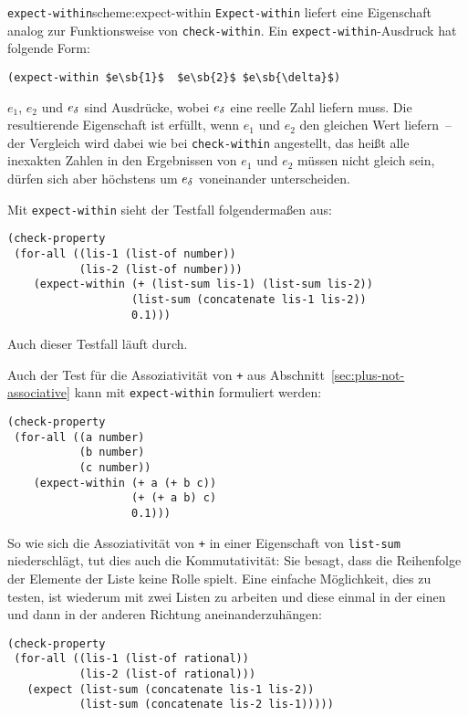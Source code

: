 \begin{feature}{\lstinline{expect-within}}{scheme:expect-within}
  \lstinline{Expect-within} liefert eine
  Eigenschaft analog zur Funktionsweise von
  \lstinline{check-within}.  Ein \lstinline{expect-within}-Ausdruck hat folgende
  Form:
\begin{lstlisting}
(expect-within $e\sb{1}$  $e\sb{2}$ $e\sb{\delta}$)
\end{lstlisting}
%
$e_1$, $e_2$ und $e\sb{\delta}$ sind Ausdrücke, wobei $e\sb{\delta}$
eine reelle Zahl liefern muss.  Die resultierende Eigenschaft ist
erfüllt, wenn $e_1$ und $e_2$ den gleichen Wert liefern~-- der
Vergleich wird dabei wie bei \lstinline{check-within} angestellt, das heißt
alle inexakten Zahlen in den Ergebnissen von $e_1$ und $e_2$ müssen
nicht gleich sein, dürfen sich aber höchstens um $e\sb{\delta}$
voneinander unterscheiden.
\end{feature}

Mit \lstinline{expect-within} sieht der Testfall folgendermaßen aus:
%
\begin{lstlisting}
(check-property
 (for-all ((lis-1 (list-of number))
           (lis-2 (list-of number)))
    (expect-within (+ (list-sum lis-1) (list-sum lis-2))
                   (list-sum (concatenate lis-1 lis-2))
                   0.1)))
\end{lstlisting}
%
Auch dieser Testfall läuft durch.

Auch der Test für die Assoziativität von \lstinline{+} aus
Abschnitt~\ref{sec:plus-not-associative} kann mit
\lstinline{expect-within} formuliert werden:
%
\begin{lstlisting}
(check-property
 (for-all ((a number)
           (b number)
           (c number))
    (expect-within (+ a (+ b c))
                   (+ (+ a b) c)
                   0.1)))
\end{lstlisting}
%
So wie sich die Assoziativität von \lstinline{+} in einer Eigenschaft von
\lstinline{list-sum} niederschlägt, tut dies auch die Kommutativität: Sie
besagt, dass die Reihenfolge der Elemente der Liste keine Rolle spielt.
Eine einfache Möglichkeit, dies zu testen, ist wiederum mit zwei
Listen zu arbeiten und diese einmal in der einen und dann in der
anderen Richtung aneinanderzuhängen:\label{sec:list-sum-commutative}
%
\begin{lstlisting}
(check-property
 (for-all ((lis-1 (list-of rational))
           (lis-2 (list-of rational)))
   (expect (list-sum (concatenate lis-1 lis-2))
           (list-sum (concatenate lis-2 lis-1)))))
\end{lstlisting}

